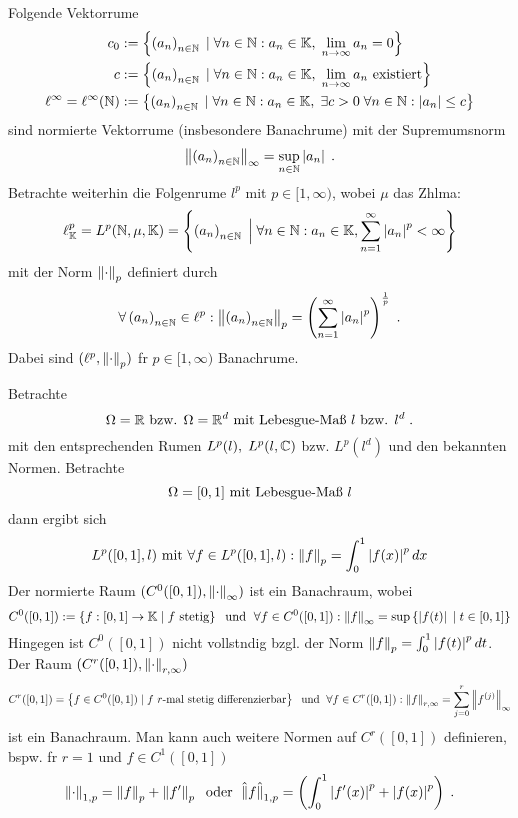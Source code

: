 \begin{ex}
	Folgende Vektorr\as ume 
	\begin{align*}
		 c_0 &:= \left\{\left (a_n\right )_{n\in \mathbb{N}} \;\vert\; \forall n \in\mathbb{N}: a_n \in \mathbb{K}, \; \lim_{n \to \infty} a_n  = 0\right\}\\
		c &:= \left\{\left (a_n\right )_{n\in \mathbb{N}} \;\vert\; \forall n\in \mathbb{N}: a_n \in \mathbb{K}, \; \lim_{n \to \infty} a_n \text{ existiert}\right\}\\
	   \ell^\infty = \ell^\infty(\mathbb{N}) &:= \left\{\left (a_n\right )_{n\in \mathbb{N}} \;\vert\; \forall n\in \mathbb{N}: a_n \in \mathbb{K},\; \exists c>0\;\forall n\in\mathbb{N}: \left\lvert a_n \right\rvert \leq c\right\}
	\end{align*}
	sind normierte Vektorr\as ume (insbesondere Banachr\as ume) mit  der Supremumsnorm 
	\[\left\lVert\left (a_n\right )_{n\in \mathbb{N}}\right\rVert_\infty = \sup_{n\in\mathbb{N}}\left\lvert a_n \right\rvert\;.\]
	Betrachte weiterhin die Folgenr\as ume \(l^p\) mit \(p \in [1,\infty)\), wobei $\mu$ das Z\as hlma\s{}:
	\[\ell_{\mathbb{K}}^p = L^p(\mathbb{N}, \mu,\mathbb{K}) = \left\{\left (a_n\right )_{n\in \mathbb{N}} \;\Big\vert\; \forall n\in \mathbb{N}: a_n \in \mathbb{K}, \sum_{n=1}^\infty \left\lvert a_n \right\rvert^p < \infty\right\}\]
	mit der Norm \(\left\lVert\cdot\right\rVert_{p}\) definiert durch
	\[\forall \left (a_n\right )_{n\in \mathbb{N}} \in \ell^p: \left\lVert\left (a_n\right )_{n\in \mathbb{N}}\right\rVert_{p} = \left(\sum_{n=1}^\infty \left\lvert a_n \right\rvert^p\right)^\frac{1}{p}\;.\]
	Dabei sind \((\ell^p, \left\lVert\cdot\right\rVert_{p})\) f\us r \(p \in [1,\infty)\) Banachr\as ume. 
\end{ex}

\begin{ex}
	\label{norm_fkt_raueme}
	Betrachte
	\[\Omega = \mathbb{R}  \text{ bzw. } \Omega = \mathbb{R}^d\text{ mit Lebesgue-Ma{\ss}{} } l \text{ bzw. } l^d\;.\]
	mit den entsprechenden R\as umen \(L^p(l), \; L^p(l,\mathbb{C})\) bzw. \(L^p(l^d)\) und den bekannten Normen.
	Betrachte 
	\[\Omega = [0,1] \text{ mit Lebesgue-Ma{\ss}{} } l \]
	dann ergibt sich 
	\[L^p([0,1],l) \text{ mit } \forall f\in L^p([0,1],l): \left\lVert f\right\rVert_{p} = \int_0^1 \left\lvert f(x) \right\rvert^p dx\]
	Der normierte Raum \((C^0([0,1]), \left\lVert\cdot\right\rVert_\infty)\) ist ein Banachraum, wobei 
	\[C^0([0,1]) := \left\{f:[0,1]\to\mathbb{K} \;\vert\; f\text{ stetig}\right\} \;\text{ und }\; \forall f \in C^0([0,1]) : \left\lVert f\right\rVert_\infty = \sup\left\{\left\lvert f(t) \right\rvert\;\vert\;t\in[0,1]\right\}\]
	Hingegen ist \(C^0([0,1])\) nicht vollst\as ndig bzgl. der Norm \(\left\lVert f\right\rVert_{p} = \int_0^1\left\lvert f(t) \right\rvert^p dt\).
	Der Raum \((C^r([0,1]), \left\lVert\cdot\right\rVert_{r,\infty})\) 
	\[C^r([0,1]) = \left\{f \in C^0([0,1])\;\vert\; f \text{ $r$-mal stetig differenzierbar}\right\} \;\text{ und }\; \forall f\in C^r([0,1]): \left\lVert f\right\rVert_{r, \infty} = \sum_{j=0}^r \left\lVert f^{(j)}\right\rVert_\infty\]
	 ist ein Banachraum. Man kann auch weitere Normen auf \(C^r([0,1])\) definieren, bspw. f\us r \(r=1\) und \(f\in C^1([0,1])\)
	 \[\left\lVert\cdot\right\rVert_{1,p} = \left\lVert f\right\rVert_{p} + \left\lVert f'\right\rVert_{p} \;\text{ oder }\; \hat\lVert f\hat\rVert_{1,p} = \left(\int_0^1 \left\lvert f'(x) \right\rvert^p + \left\lvert f(x) \right\rvert^p\right)\;.\]
	\end{ex}
	
